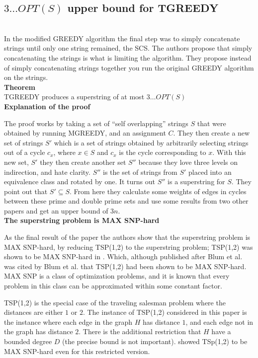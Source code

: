 \documentclass[letterpaper,11pt,titlepage]{article}
\begin{document}
\subsection*{$3 \ldots OPT(S)$ upper bound for TGREEDY}\\

In the modified GREEDY algorithm the final step was to simply concatenate strings until only one string remained, the SCS. The authors propose that simply concatenating the strings is what is limiting the algorithm. They propose instead of simply concatenating strings together you run the original GREEDY algorithm on the strings. \\

\textbf{Theorem}\\
TGREEDY produces a superstring of at most $3 \ldots OPT(S)$\\

\textbf{Explanation of the proof}

The proof works by taking a set of ``self overlapping'' strings $S$ that were obtained by running MGREEDY, and an assignment $C$. They then create a new set of strings $S'$ which is a set of strings obtained by arbitrarily selecting strings out of a cycle $c_x$, where $x \in S$ and $c_x$ is the cycle corresponding to $x$. With this new set, $S'$ they then create another set $S''$ because they love three levels on indirection, and hate clarity. $S''$ is the set of strings from $S'$ placed into an equivalence class and rotated by one. It turns out $S''$ is a superstring for $S$. They point out that $S' \subseteq S$. From here they calculate some weights of edges in cycles between these prime and double prime sets and use some results from two other papers and get an upper bound of $3n$.\\


\textbf{The superstring problem is MAX SNP-hard}

As the final result of the paper the authors show that the superstring problem is MAX SNP-hard, by reducing TSP(1,2) to the superstring problem; TSP(1,2) was shown to be MAX SNP-hard in \cite{papadimitriou1993}.  Which, although published after Blum et al. was cited by Blum et al. that TSP(1,2) had been shown to be MAX SNP-hard.  MAX SNP is a class of optimization problems, and it is known that every problem in this class can be approximated within some constant factor. 

TSP(1,2) is the special case of the traveling salesman problem where the distances are either $1$ or $2$.  The instance of TSP(1,2) considered in this paper is the instance where each edge in the graph $H$ has distance $1$, and each edge not in the graph has distance $2$.  There is the additional restriction that $H$ have a bounded degree $D$ (the precise bound is not important).  \cite{papadimitriou1993} showed TSp(1,2) to be MAX SNP-hard even for this restricted version.  
\end{document}
